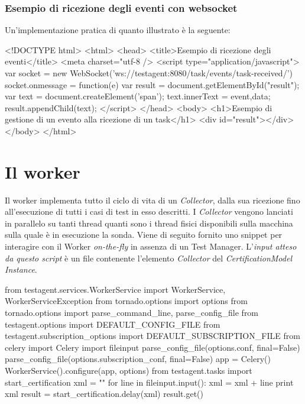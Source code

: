 \documentclass[../main.tex]{subfiles}
\begin{document}
\subsubsection{Esempio di ricezione degli eventi con websocket}
Un'implementazione pratica di quanto illustrato è la seguente:
\begin{html}
<!DOCTYPE html>
<html>
    <head>
        <title>Esempio di ricezione degli eventi</title>
        <meta charset="utf-8 />
        <script type="application/javascript">
            var socket = new WebSocket('ws://testagent:8080/task/events/task-received/')
            socket.onmessage = function(e) {
                var result = document.getElementById("result");
                var text = document.createElement('span');
                text.innerText = event,data;
                result.appendChild(text);
            }
        </script>
    </head>
    <body>
        <h1>Esempio di gestione di un evento alla ricezione di un task</h1>
        <div id="result"></div>
    </body>
</html>
\end{html}
\section{Il worker}
Il worker implementa tutto il ciclo di vita di un \textit{Collector}, dalla sua ricezione fino all'esecuzione di tutti i casi di test in esso descritti.
I \textit{Collector} vengono lanciati in parallelo su tanti thread quanti sono i thread fisici disponibili sulla macchina sulla quale è in esecuzione la sonda.
Viene di seguito fornito uno snippet per interagire con il Worker \textit{on-the-fly} in assenza di un Test Manager.
L'\textit{input atteso da questo script} è un file contenente l'elemento \textit{Collector} del \textit{CertificationModel Instance}.

\begin{python}
from testagent.services.WorkerService import WorkerService, WorkerServiceException
from tornado.options import options
from tornado.options import parse_command_line, parse_config_file
from testagent.options import DEFAULT_CONFIG_FILE
from testagent.subscription_options import DEFAULT_SUBSCRIPTION_FILE
from celery import Celery
import fileinput
parse_config_file(options.conf, final=False)
parse_config_file(options.subscription_conf, final=False)
app = Celery()
WorkerService().configure(app, options)
from testagent.tasks import start_certification
xml = ""
for line in fileinput.input():
    xml = xml + line 
print xml
result = start_certification.delay(xml)
result.get()
\end{python}
\end{document}
